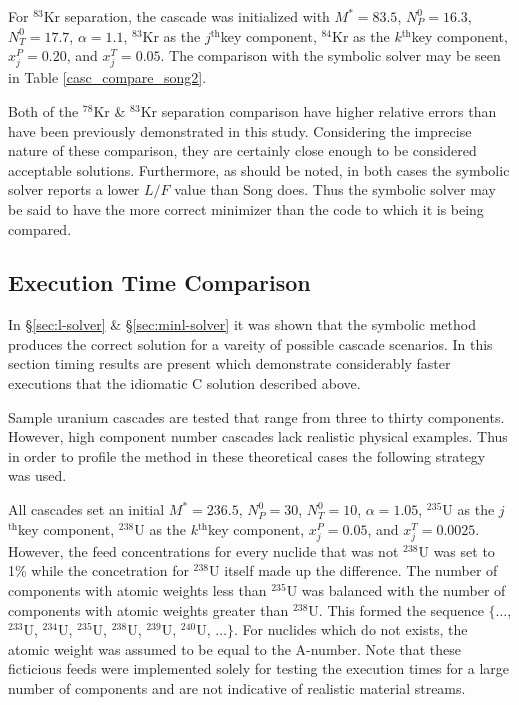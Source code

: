 \documentclass[preprint,12pt]{elsarticle}
\newcommand{\superscript}[1]{\ensuremath{^{\textrm{#1}}}}
\newcommand{\nuc}[2]{\superscript{#2}{#1}}
\newcommand{\jth}[0]{$j$\superscript{th}}
\newcommand{\kth}[0]{$k$\superscript{th}}
\begin{document}
For \nuc{Kr}{83} separation, the cascade was initialized with $M^*=83.5$, 
$N_P^0=16.3$, $N_T^0=17.7$, $\alpha=1.1$, \nuc{Kr}{83} as the \jth key
component, \nuc{Kr}{84} as the \kth key component, $x_j^P=0.20$, and
$x_j^T=0.05$.  The comparison with the symbolic solver may be seen in Table
\ref{casc_compare_song2}.

Both of the \nuc{Kr}{78} \&  \nuc{Kr}{83} separation comparison have higher 
relative errors than have been previously demonstrated in this study.  
Considering the imprecise nature of these comparison, 
they are certainly close enough to be considered acceptable solutions.  
Furthermore, as should be noted, in both cases the symbolic solver reports a 
lower $L/F$ value than Song does.  Thus the symbolic solver may be said to have
the more correct minimizer than the code to which it is being compared.

\subsection{Execution Time Comparison}
\label{sec:timings-solver}

In \S\ref{sec:l-solver} \& \S\ref{sec:minl-solver} it was shown that the symbolic 
method produces the correct solution for a vareity of possible cascade scenarios.
In this section timing results are present which demonstrate considerably faster
executions that the idiomatic C solution described above.

Sample uranium cascades are tested that range from three to thirty components.  
However, high component number cascades lack realistic physical examples.  
Thus in order to profile the method in these theoretical cases the following strategy
was used.

All cascades set  an initial $M^*=236.5$,
$N_P^0=30$, $N_T^0=10$, $\alpha=1.05$, \nuc{U}{235} as the \jth key
component, \nuc{U}{238} as the \kth key component, $x_j^P=0.05$, and
$x_j^T=0.0025$.  However, the feed concentrations for every nuclide that was not
\nuc{U}{238} was set to 1\%
while the concetration for \nuc{U}{238} itself made up the difference.  The number
of components with atomic weights less than \nuc{U}{235} was balanced with the 
number of components with atomic weights greater than \nuc{U}{238}.  This formed
the sequence $\{\ldots$, \nuc{U}{233}, \nuc{U}{234}, \nuc{U}{235}, \nuc{U}{238}, 
\nuc{U}{239}, \nuc{U}{240}, $\ldots\}$.  For nuclides which do not exists, the 
atomic weight was assumed to be equal to the A-number.  Note that these ficticious
feeds were implemented solely for testing the execution times for a large number
of components and are not indicative of realistic material streams.
\end{document}
